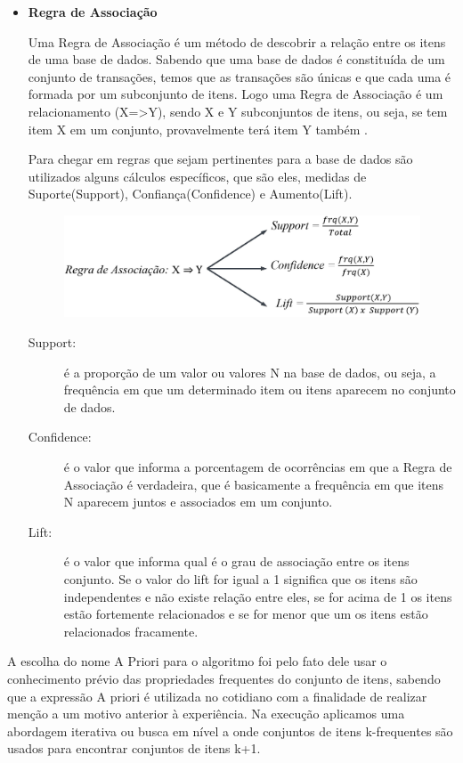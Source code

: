 \documentclass[tcc1]{uftex}
\begin{document}
\begin{itemize}
 \setlength{\parindent}{1.25cm}
 \item\textbf{Regra de Associação}
  
  Uma Regra de Associação é um método de descobrir a relação entre os itens de uma base de dados. Sabendo que uma base de dados é constituída de um conjunto de transações, temos que as transações são únicas e que cada uma é formada por um subconjunto de itens. Logo uma Regra de Associação é um relacionamento (X=>Y), sendo X e Y subconjuntos de itens, ou seja, se tem item X em um conjunto, provavelmente terá item Y também \cite{agrawal1993mining}.
  
  Para chegar em regras que sejam pertinentes para a base de dados são utilizados alguns cálculos específicos, que são eles, medidas de  Suporte(Support), Confiança(Confidence) e Aumento(Lift).
    \begin{figure}[!h]
    \centering
    \includegraphics[width=12cm]{formula_000.jpeg}
    \end{figure}
    \begin{description}
    \item[Support:] é a proporção de um valor ou valores N na base de dados, ou seja, a frequência em que um determinado item ou itens aparecem no conjunto de dados. 
    \item[Confidence:] é o valor que informa a porcentagem de ocorrências em que a Regra de Associação é verdadeira, que é basicamente a frequência em que itens N aparecem juntos e associados em um conjunto. 
    \item[Lift:] é o valor que informa qual é o grau de associação entre os itens conjunto. Se o valor do lift for igual a 1 significa que os itens são independentes e não existe relação entre eles, se for acima de 1 os itens estão fortemente relacionados e se for menor que um os itens estão relacionados fracamente. 
    \end{description}

 \end{itemize}

A escolha do nome  A Priori para o algoritmo foi pelo fato dele usar o conhecimento prévio das propriedades frequentes do conjunto de itens, sabendo que a expressão A priori é utilizada no cotidiano com a finalidade de realizar menção a um motivo anterior à experiência. Na execução aplicamos uma abordagem iterativa ou busca em nível a onde conjuntos de itens k-frequentes são usados para encontrar conjuntos de itens k+1. 
\end{document}
